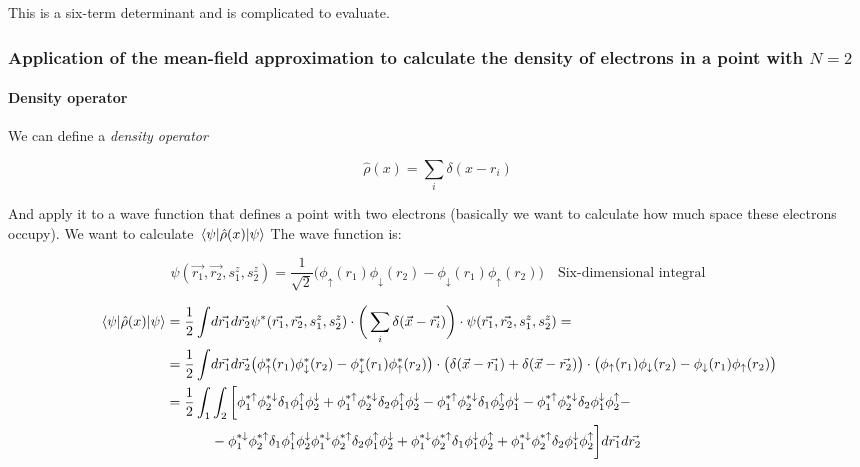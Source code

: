 		This is a six-term determinant and is complicated to evaluate.


		\subsubsection{Application of the mean-field approximation to calculate the density of electrons in a point with $N=2$}

			\paragraph{Density operator}
			We can define a \textit{density operator}

			$$\hat{\rho}(x)=\sum_i\delta(x-r_i)$$

			And apply it to a wave function that defines a point with two electrons (basically we want to calculate how much space these electrons occupy).
			We want to calculate $\mel{\psi}{\hat{\rho}(x)}{\psi}$
			The wave function is:

			$$\psi(\vec{r_1},\vec{r_2},s_1^z,s_2^z)=\frac{1}{\sqrt{2}}\big(\phi_\uparrow(r_1)\phi_\downarrow(r_2)-\phi_\downarrow(r_1)\phi_\uparrow(r_2)\big)\quad\text{Six-dimensional integral}$$

			\begin{align*}
				\mel{\psi}{\hat{\rho}(x)}{\psi}=\frac{1}{2}\int &d\vec{r_1}d\vec{r_2} \psi^*(\vec{r_1},\vec{r_2},s_1^z,s_2^z)\cdot\bigg(\sum_i \delta(\vec{x}-\vec{r_i})\bigg)\cdot\psi(\vec{r_1},\vec{r_2},s_1^z,s_2^z)=\\
				=\frac{1}{2}\int &d\vec{r_1}d\vec{r_2}\big(\phi^*_\uparrow(r_1)\phi^*_\downarrow(r_2)-\phi^*_\downarrow(r_1)\phi^*_\uparrow(r_2)\big)\cdot\big(\delta(\vec{x}-\vec{r_1})+\delta(\vec{x}-\vec{r_2})\big)\cdot\big(\phi_\uparrow(r_1)\phi_\downarrow(r_2)-\phi_\downarrow(r_1)\phi_\uparrow(r_2)\big)\\
				=\frac{1}{2}\int_1&\int_2\bigg[\phi_1^{*\uparrow}\phi_2^{*\downarrow}\delta_1\phi_1^\uparrow\phi_2^\downarrow+\phi_1^{*\uparrow}\phi_2^{*\downarrow}\delta_2\phi_1^\uparrow\phi_2^\downarrow-\phi_1^{*\uparrow}\phi_2^{*\downarrow}\delta_1\phi_2^\uparrow\phi_1^\downarrow-\phi_1^{*\uparrow}\phi_2^{*\downarrow}\delta_2\phi_1^\downarrow\phi_2^\uparrow-\\
													&-\phi_1^{*\downarrow}\phi_2^{*\uparrow}\delta_1\phi_1^\uparrow\phi_2^\downarrow\phi_1^{*\downarrow}\phi_2^{*\uparrow}\delta_2\phi_1^\uparrow\phi_2^\downarrow+\phi_1^{*\downarrow}\phi_2^{*\uparrow}\delta_1\phi_1^\downarrow\phi_2^\uparrow+\phi_1^{*\downarrow}\phi_2^{*\uparrow}\delta_2\phi_1^\downarrow\phi_2^\uparrow\bigg]d\vec{r_1}d\vec{r_2}
			\end{align*}

